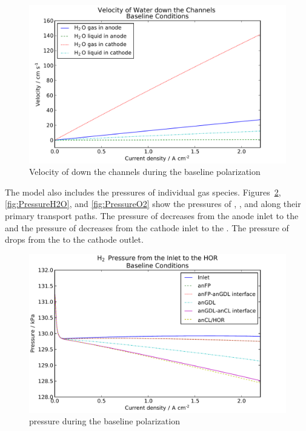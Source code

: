\begin{figure}[htbp]
  \includegraphics[width=\linewidth]{Results/Cell/Model/1/Velocity}%
  \caption{Velocity of  down the channels during the baseline polarization}%
  \label{fig:BaselineVelocity}
\end{figure}

The model also includes the pressures of individual gas species.  Figures~\ref{fig:PressureH2}, \ref{fig:PressureH2O}, and \ref{fig:PressureO2} show the pressures of , , and  along their primary transport paths.  The pressure of  decreases from the anode inlet to the  and the pressure of  decreases from the cathode inlet to the .  The pressure of  drops from the  to the cathode outlet.

\begin{figure}[htbp]
  \includegraphics[width=\linewidth]{Results/Cell/Model/1/PressureH2}%
  \caption{ pressure during the baseline polarization}%
  \label{fig:PressureH2}
\end{figure}

